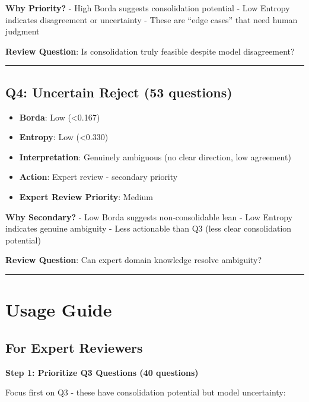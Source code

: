 \documentclass[
  letterpaper,
]{report}
\providecommand{\tightlist}{%
  \setlength{\itemsep}{0pt}\setlength{\parskip}{0pt}}
\begin{document}
\textbf{Why Priority?} - High Borda suggests consolidation potential -
Low Entropy indicates disagreement or uncertainty - These are ``edge
cases'' that need human judgment

\textbf{Review Question}: Is consolidation truly feasible despite model
disagreement?

\begin{center}\rule{0.5\linewidth}{0.5pt}\end{center}

\subsection{Q4: Uncertain Reject (53
questions)}\label{q4-uncertain-reject-53-questions}

\begin{itemize}
\tightlist
\item
  \textbf{Borda}: Low (\textless0.167)
\item
  \textbf{Entropy}: Low (\textless0.330)
\item
  \textbf{Interpretation}: Genuinely ambiguous (no clear direction, low
  agreement)
\item
  \textbf{Action}: Expert review - secondary priority
\item
  \textbf{Expert Review Priority}: Medium
\end{itemize}

\textbf{Why Secondary?} - Low Borda suggests non-consolidable lean - Low
Entropy indicates genuine ambiguity - Less actionable than Q3 (less
clear consolidation potential)

\textbf{Review Question}: Can expert domain knowledge resolve ambiguity?

\begin{center}\rule{0.5\linewidth}{0.5pt}\end{center}

\section{Usage Guide}\label{usage-guide}

\subsection{For Expert Reviewers}\label{for-expert-reviewers}

\textbf{Step 1: Prioritize Q3 Questions (40 questions)}

Focus first on Q3 - these have consolidation potential but model
uncertainty:
\end{document}
